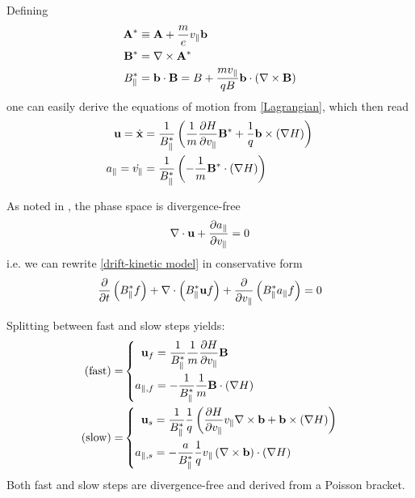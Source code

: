 Defining
\begin{subequations}
	\begin{align}
		\mathbf{A}^\ast & \equiv \mathbf{A} + \frac{m}{e} v_\parallel \mathbf{b} \\
		\mathbf{B}^\ast & = \nabla \times \mathbf{A}^\ast \\
		B_\parallel^\ast & = \mathbf{b} \cdot \mathbf{B} = B + \frac{m v_\parallel}{q B} \mathbf{b} \cdot \left( \nabla \times \mathbf{B} \right)
	\end{align}
\end{subequations}
one can easily derive the equations of motion from \eqref{Lagrangian}, which then read
\begin{subequations}
	\begin{align}
		\mathbf{u} = \dot{\mathbf{x}} & = \frac{1}{B_\parallel^\ast} \left( \frac{1}{m} \frac{\partial H}{\partial v_\parallel} \mathbf{B}^\ast + \frac{1}{q} \mathbf{b} \times \left(\nabla H\right) \right) \label{eom for bu} \\
		a_\parallel = \dot{v_\parallel} & = \frac{1}{B_\parallel^\ast} \left( -\frac{1}{m} \mathbf{B}^\ast \cdot \left( \nabla H \right) \right) \label{eom for ap}
	\end{align}
\end{subequations}

As noted in \cite{Latu_2017}, the phase space is divergence-free
\begin{equation}
	\nabla \cdot \mathbf{u} + \frac{\partial a_\parallel}{\partial v_\parallel} = 0
\end{equation}
i.e. we can rewrite \eqref{drift-kinetic model} in conservative form
\begin{equation}\label{conservation1}
	\frac{\partial }{\partial t}\left(B_\parallel^\ast f\right) + \nabla\cdot\left( B_\parallel^\ast \mathbf{u} f \right) + \frac{\partial }{\partial v_\parallel} \left( B_\parallel^\ast a_\parallel f \right) = 0
\end{equation}

Splitting between fast and slow steps yields:
\begin{subequations}
	\begin{align}
		(\text{fast}) = & \left\{ \begin{aligned}
			\mathbf{u}_f & = \frac{1}{B_\parallel^\ast} \frac{1}{m} \frac{\partial H}{\partial v_\parallel} \mathbf{B} \\
			a_{\parallel, f} & = -\frac{1}{B_\parallel^\ast} \frac{1}{m} \mathbf{B} \cdot \left( \nabla H \right)
		\end{aligned} \right. \label{split step fast}\\
		(\text{slow}) = &  \left\{ \begin{aligned}
			\mathbf{u}_s & = \frac{1}{B_\parallel^\ast} \frac{1}{q} \left( \frac{\partial H}{\partial v_\parallel} v_\parallel \nabla \times \mathbf{b} + \mathbf{b} \times \left(\nabla H\right) \right) \\
			a_{\parallel, s} & = - \frac{a}{B_\parallel^\ast} \frac{1}{q} v_\parallel \left( \nabla \times \mathbf{b} \right) \cdot \left( \nabla H \right)
		\end{aligned} \right. \label{split step slow}
	\end{align}
\end{subequations}
Both fast and slow steps are divergence-free and derived from a Poisson bracket.

